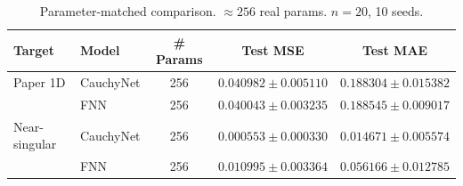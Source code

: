 \begin{table}[ht]\centering
\caption{Parameter-matched comparison. $\approx 256$ real params. $n=20$, 10 seeds.}
\label{tab:param_matched}
\begin{tabular}{llccc}
\toprule
Target & Model & \# Params & Test MSE & Test MAE \\
\midrule
Paper 1D & CauchyNet & 256 & $0.040982 \pm 0.005110$ & $0.188304 \pm 0.015382$ \\
 & FNN & 256 & $0.040043 \pm 0.003235$ & $0.188545 \pm 0.009017$ \\
\midrule
Near-singular & CauchyNet & 256 & $0.000553 \pm 0.000330$ & $0.014671 \pm 0.005574$ \\
 & FNN & 256 & $0.010995 \pm 0.003364$ & $0.056166 \pm 0.012785$ 
\bottomrule
\end{tabular}
\end{table}